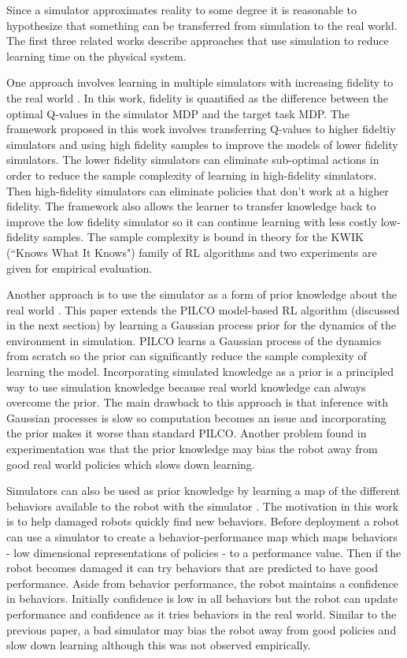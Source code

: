 \documentclass[12 pt]{article}
\begin{document}
Since a simulator approximates reality to some degree it is reasonable to hypothesize that something can be transferred from simulation to the real world. The first three related works describe approaches that use simulation to reduce learning time on the physical system.

One approach involves learning in multiple simulators with increasing fidelity to the real world \cite{cutler2014reinforcement}. 
In this work, fidelity is quantified as the difference between the optimal Q-values in the simulator MDP and the target task MDP.
The framework proposed in this work involves transferring Q-values to higher fideltiy simulators and using high fidelity samples to improve the models of lower fidelity simulators.
The lower fidelity simulators can eliminate sub-optimal actions in order to reduce the sample complexity of learning in high-fidelity simulators. 
Then high-fidelity simulators can eliminate policies that don't work at a higher fidelity. 
The framework also allows the learner to transfer knowledge back to improve the low fidelity simulator so it can continue learning with less costly low-fidelity samples.
The sample complexity is bound in theory for the KWIK (``Knows What It Knows") family of RL algorithms and two experiments are given for empirical evaluation. 

Another approach is to use the simulator as a form of prior knowledge about the real world \cite{cutler2015efficient}.
This paper extends the PILCO model-based RL algorithm (discussed in the next section) by learning a Gaussian process prior for the dynamics of the environment in simulation. PILCO learns a Gaussian process of the dynamics from scratch so the prior can significantly reduce the sample complexity of learning the model. 
Incorporating simulated knowledge as a prior is a principled way to use simulation knowledge because  real world knowledge can always overcome the prior.
The main drawback to this approach is that inference with Gaussian processes is slow so computation becomes an issue and incorporating the prior makes it worse than standard PILCO.
Another problem found in experimentation was that the prior knowledge may bias the robot away from good real world policies which slows down learning.

Simulators can also be used as prior knowledge by learning a map of the different behaviors available to the robot with the simulator \cite{cully2015robots}.
The motivation in this work is to help damaged robots quickly find new behaviors.
Before deployment a robot can use a simulator to create a behavior-performance map which maps behaviors - low dimensional representations of policies - to a performance value.
Then if the robot becomes damaged it can try behaviors that are predicted to have good performance.
Aside from behavior performance, the robot maintains a confidence in behaviors. Initially confidence is low in all behaviors but the robot can update performance and confidence as it tries behaviors in the real world. Similar to the previous paper, a bad simulator may bias the robot away from good policies and slow down learning although this was not observed empirically.
\end{document}
